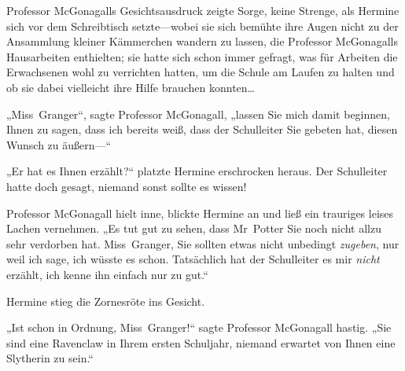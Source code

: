Professor McGonagalls Gesichtsausdruck zeigte Sorge, keine Strenge, als Hermine sich vor dem Schreibtisch setzte—wobei sie sich bemühte ihre Augen nicht zu der Ansammlung kleiner Kämmerchen wandern zu lassen, die Professor McGonagalls Hausarbeiten enthielten; sie hatte sich schon immer gefragt, was für Arbeiten die Erwachsenen wohl zu verrichten hatten, um die Schule am Laufen zu halten und ob sie dabei vielleicht ihre Hilfe brauchen konnten…

„Miss~Granger“, sagte Professor McGonagall, „lassen Sie mich damit beginnen, Ihnen zu sagen, dass ich bereits weiß, dass der Schulleiter Sie gebeten hat, diesen Wunsch zu äußern—“

„Er hat es Ihnen erzählt?“ platzte Hermine erschrocken heraus. Der Schulleiter hatte doch gesagt, niemand sonst sollte es wissen!

Professor McGonagall hielt inne, blickte Hermine an und ließ ein trauriges leises Lachen vernehmen. „Es tut gut zu sehen, dass Mr~Potter Sie noch nicht allzu sehr verdorben hat. Miss~Granger, Sie sollten etwas nicht unbedingt \emph{zugeben}, nur weil ich sage, ich wüsste es schon. Tatsächlich hat der Schulleiter es mir \emph{nicht} erzählt, ich kenne ihn einfach nur zu gut.“

Hermine stieg die Zornesröte ins Gesicht.

„Ist schon in Ordnung, Miss~Granger!“ sagte Professor McGonagall hastig. „Sie sind eine Ravenclaw in Ihrem ersten Schuljahr, niemand erwartet von Ihnen eine Slytherin zu sein.“

